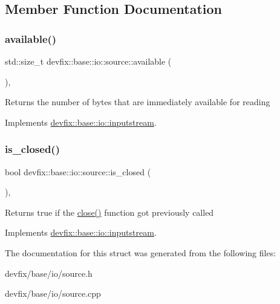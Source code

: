 \subsection{Member Function Documentation}
\mbox{\label{structdevfix_1_1base_1_1io_1_1source_a911f4ba79499a623de30cf16d3d26d47}} 
\subsubsection{\texorpdfstring{available()}{available()}}
{\footnotesize\ttfamily std\+::size\+\_\+t devfix\+::base\+::io\+::source\+::available (\begin{DoxyParamCaption}{ }\end{DoxyParamCaption})\hspace{0.3cm}{\ttfamily [override]}, {\ttfamily [virtual]}}

\begin{DoxyReturn}{Returns}
the number of bytes that are immediately available for reading 
\end{DoxyReturn}


Implements \hyperlink{structdevfix_1_1base_1_1io_1_1inputstream_ace04813af676b6c81fa452eb4d81a796}{devfix\+::base\+::io\+::inputstream}.

\mbox{\label{structdevfix_1_1base_1_1io_1_1source_a406834cf6651d48949b96d0ef49cc6c1}} 
\subsubsection{\texorpdfstring{is\+\_\+closed()}{is\_closed()}}
{\footnotesize\ttfamily bool devfix\+::base\+::io\+::source\+::is\+\_\+closed (\begin{DoxyParamCaption}{ }\end{DoxyParamCaption})\hspace{0.3cm}{\ttfamily [override]}, {\ttfamily [virtual]}}

\begin{DoxyReturn}{Returns}
true if the \hyperlink{structdevfix_1_1base_1_1io_1_1source_aa00a381c8a166cbbc5dbf6de4b56590e}{close()} function got previously called 
\end{DoxyReturn}


Implements \hyperlink{structdevfix_1_1base_1_1io_1_1inputstream_a9da6b400424ff476ed0479193c219fa9}{devfix\+::base\+::io\+::inputstream}.



The documentation for this struct was generated from the following files\+:\begin{DoxyCompactItemize}
\item 
devfix/base/io/source.\+h\item 
devfix/base/io/source.\+cpp\end{DoxyCompactItemize}
